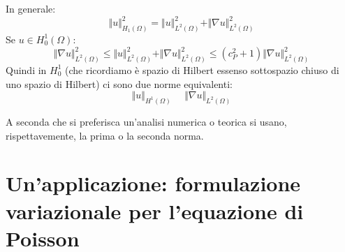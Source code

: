 \documentclass[10pt,a4paper,twoside,openright]{book}
\begin{document}
\begin{oss}
	In generale:
	\begin{equation*}
		\Vert u\Vert _{H_{1}( \Omega )}^{2} =\Vert u\Vert _{L^{2}( \Omega )}^{2} +\Vert \nabla u\Vert _{L^{2}( \Omega )}^{2}
	\end{equation*}
	Se $\displaystyle u\in H_{0}^{1}( \Omega )$:
	\begin{equation}
		\Vert \nabla u\Vert _{L^{2}( \Omega )}^{2} \leqslant \Vert u\Vert _{L^{2}( \Omega )}^{2} +\Vert \nabla u\Vert _{L^{2}( \Omega )}^{2} \leqslant \left( c_{P}^{2} +1\right)\Vert \nabla u\Vert _{L^{2}( \Omega )}^{2}
		\label{eq:af-stima-poincare}
	\end{equation}
	Quindi in $\displaystyle H_{0}^{1}$ (che ricordiamo è spazio di Hilbert essenso sottospazio chiuso di uno spazio di Hilbert) ci sono due norme equivalenti:
	\begin{equation*}
		\Vert u\Vert _{H^{1}( \Omega )} \ \ \ \ \ \ \Vert \nabla u\Vert _{L^{2}( \Omega )}
	\end{equation*}
\end{oss}
A seconda che si preferisca un'analisi numerica o teorica si usano, rispettavemente, la prima o la seconda norma.
\chapter{Un'applicazione: formulazione variazionale per l'equazione di Poisson}
\end{document}
